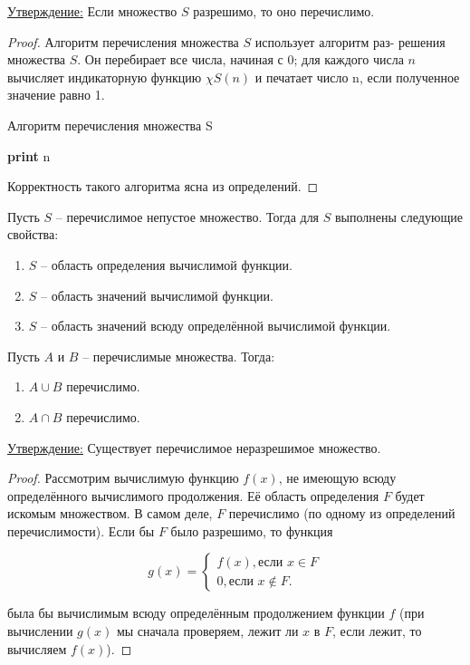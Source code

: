 \documentclass[a4paper, 12pt]{article}
\newcommand{\statement}{\underline{Утверждение:} }
\begin{document}
\statement{
Если множество $S$ разрешимо, то оно перечислимо.
}

\begin{proof}
Алгоритм перечисления множества $S$ использует алгоритм раз-
решения множества $S$. Он перебирает все числа, начиная с 0; для каждого числа
$n$ вычисляет индикаторную функцию $\chi S(n)$ и печатает число n, если полученное
значение равно 1.

            \begin{algorithm}
            \caption{Алгоритм перечисления множества S}
            \begin{algorithmic}[1]
                        \State \textbf{print} n
                    \EndIf
                \EndFor
            \EndFunction
            \end{algorithmic}
            \end{algorithm}
            
Корректность такого алгоритма ясна из определений.
\end{proof}

Пусть $S$ -- перечислимое непустое множество. Тогда для $S$ выполнены следующие свойства:

\begin{enumerate}
        \item $S$ -- область определения вычислимой функции.
        \item $S$ -- область значений вычислимой функции.
        \item $S$ -- область значений всюду определённой вычислимой функции.
\end{enumerate}
    
Пусть $A$ и $B$ -- перечислимые множества. Тогда:

\begin{enumerate}
    \item $A \cup B$ перечислимо.
    \item $A \cap B$ перечислимо.
\end{enumerate}

\statement{
    Существует перечислимое неразрешимое множество.
}

\begin{proof}
    Рассмотрим вычислимую функцию $f(x)$, не имеющую всюду определённого вычислимого продолжения. Её область определения $F$ будет искомым множеством. В самом деле, $F$ перечислимо (по одному из определений перечислимости). Если бы $F$ было разрешимо, то функция
    
    \[
        g(x) =
        \begin{cases}
            f(x), \text{если $x \in F$} \\
            0, \text{если  $x \notin F$}.
        \end{cases}
    \]
    
    была бы вычислимым всюду определённым продолжением функции $f$ (при вычислении $g(x)$ мы сначала проверяем, лежит ли $x$ в $F$, если лежит, то вычисляем $f(x)$).
\end{proof}
\end{document}
